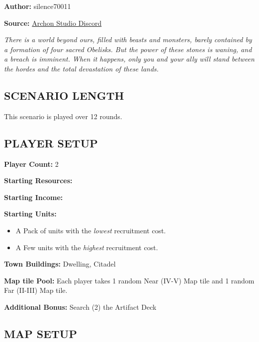
\begin{multicols*}{2}

\textbf{Author:} silence70011

\textbf{Source:} \href{https://discord.com/channels/740870068178649108/1233112440322002964/1233112440322002964}{Archon Studio Discord}

\textit{There is a world beyond ours, filled with beasts and monsters, barely contained by a formation of four sacred Obelisks.
  But the power of these stones is waning, and a breach is imminent.
  When it happens, only you and your ally will stand between the hordes and the total devastation of these lands.
}

\subsection*{\MakeUppercase{Scenario Length}}

This scenario is played over 12 rounds.

\subsection*{\MakeUppercase{Player Setup}}

\textbf{Player Count:} 2

\textbf{Starting Resources:}\par
{}

\textbf{Starting Income:}\par
{}

\textbf{Starting Units:}
\begin{itemize}
  \item A Pack of  units with the \textit{lowest} recruitment cost.
  \item A Few  units with the \textit{highest} recruitment cost.
\end{itemize}

\textbf{Town Buildings:}  Dwelling, Citadel

\textbf{Map tile Pool:} Each player takes 1 random Near (IV-V) Map tile and 1 random Far (II-III) Map tile.

\textbf{Additional Bonus:} Search (2) the Artifact Deck

\subsection*{\MakeUppercase{Map Setup}}


\end{multicols*}
